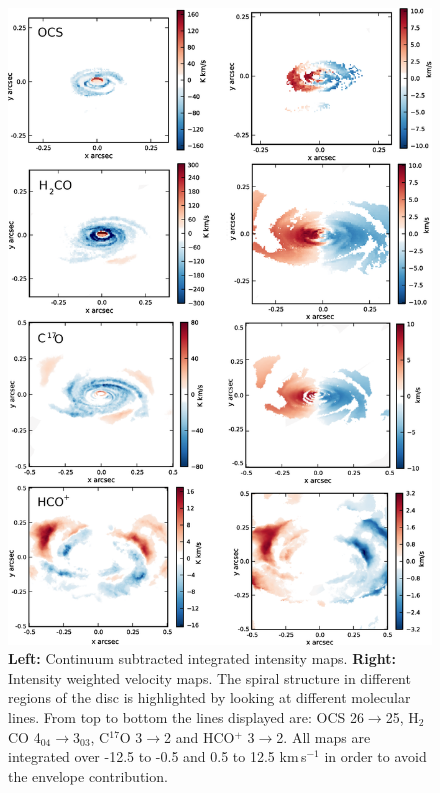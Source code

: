 \documentclass[useAMS,usenatbib]{mn2e}
\begin{document}
\begin{figure}
 \includegraphics[width=150mm]{Figures/sim/imageALL_30deg_all2.eps}
 \caption{{\bf Left:} Continuum subtracted integrated intensity maps. {\bf Right:} Intensity weighted velocity maps. The spiral structure in different regions of the disc is highlighted by looking at different molecular lines. From top to bottom the lines displayed are: OCS 26$\rightarrow$25, H$_2$CO 4$_{04}$$\rightarrow$3$_{03}$, C$^{17}$O 3$\rightarrow$2 and HCO$^+$ 3$\rightarrow$2. All maps are integrated over -12.5 to -0.5 and 0.5 to 12.5 km$\,$s$^{-1}$ in order to avoid the envelope contribution.}
 \label{sim_all}
\end{figure}
\end{document}
